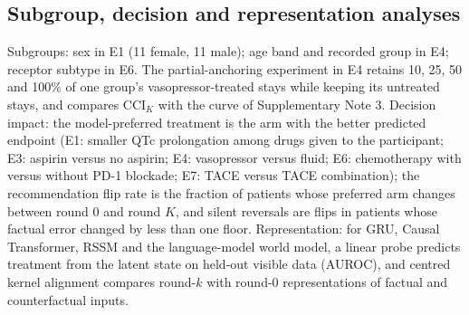 \documentclass[11pt,a4paper]{article}
\newcommand{\CCI}{\mathrm{CCI}}
\begin{document}
\subsection{Subgroup, decision and representation analyses}
Subgroups: sex in E1 (11 female, 11 male); age band and recorded group in E4; receptor subtype in E6. The partial-anchoring experiment in E4 retains 10, 25, 50 and 100\% of one group's vasopressor-treated stays while keeping its untreated stays, and compares $\CCI_K$ with the curve of Supplementary Note 3. Decision impact: the model-preferred treatment is the arm with the better predicted endpoint (E1: smaller QTc prolongation among drugs given to the participant; E3: aspirin versus no aspirin; E4: vasopressor versus fluid; E6: chemotherapy with versus without PD-1 blockade; E7: TACE versus TACE combination); the recommendation flip rate is the fraction of patients whose preferred arm changes between round 0 and round $K$, and silent reversals are flips in patients whose factual error changed by less than one floor. Representation: for GRU, Causal Transformer, RSSM and the language-model world model, a linear probe predicts treatment from the latent state on held-out visible data (AUROC), and centred kernel alignment compares round-$k$ with round-0 representations of factual and counterfactual inputs.
\end{document}
